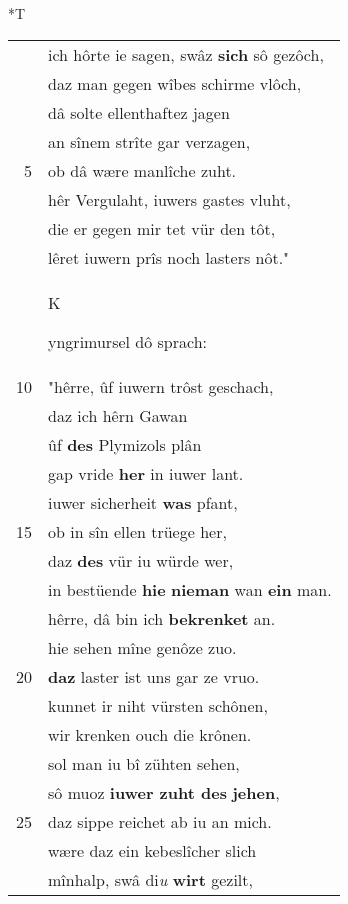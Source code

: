 \documentclass[8pt,a4paper,notitlepage]{article}
\begin{document}
\begin{table}[ht]
\begin{minipage}[t]{0.5\linewidth}
\end{minipage}
\hspace{0.5cm}
\begin{minipage}[t]{0.5\linewidth}
\small
\begin{center}*T
\end{center}
\begin{tabular}{rl}
 & ich hôrte ie sagen, swâz \textbf{sich} sô gezôch,\\ 
 & daz man gegen wîbes schirme vlôch,\\ 
 & dâ solte ellenthaftez jagen\\ 
 & an sînem strîte gar verzagen,\\ 
5 & ob dâ wære manlîche zuht.\\ 
 & hêr Vergulaht, iuwers gastes vluht,\\ 
 & die er gegen mir tet vür den tôt,\\ 
 & lêret iuwern prîs noch lasters nôt."\\ 
 & \begin{large}K\end{large}yngrimursel dô sprach:\\ 
10 & "hêrre, ûf iuwern trôst geschach,\\ 
 & daz ich hêrn Gawan\\ 
 & ûf \textbf{des} Plymizols plân\\ 
 & gap vride \textbf{her} in iuwer lant.\\ 
 & iuwer sicherheit \textbf{was} pfant,\\ 
15 & ob in sîn ellen trüege her,\\ 
 & daz \textbf{des} vür iu würde wer,\\ 
 & in bestüende \textbf{hie} \textbf{nieman} wan \textbf{ein} man.\\ 
 & hêrre, dâ bin ich \textbf{bekrenket} an.\\ 
 & hie sehen mîne genôze zuo.\\ 
20 & \textbf{daz} laster ist uns gar ze vruo.\\ 
 & kunnet ir niht vürsten schônen,\\ 
 & wir krenken ouch die krônen.\\ 
 & sol man iu bî zühten sehen,\\ 
 & sô muoz \textbf{iuwer zuht des} \textbf{jehen},\\ 
25 & daz sippe reichet ab iu an mich.\\ 
 & wære daz ein kebeslîcher slich\\ 
 & mînhalp, swâ di\textit{u} \textbf{wirt} gezilt,\\ 

\end{tabular}
\end{minipage}
\end{table}
\end{document}
